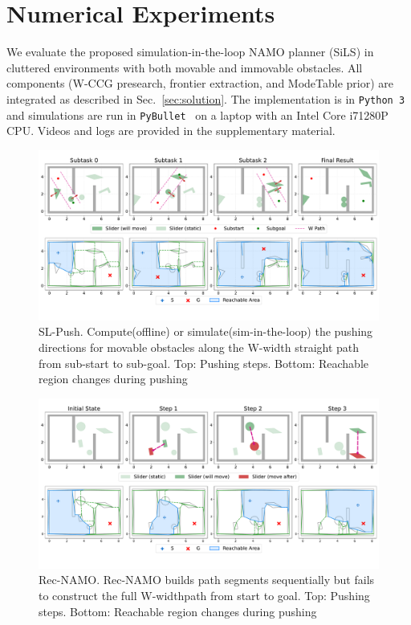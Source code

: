 \section{Numerical Experiments}
\label{sec:experiments}
We evaluate the proposed simulation-in-the-loop NAMO planner (SiLS)
in cluttered environments with both movable and immovable obstacles.
All components (W-CCG presearch, frontier extraction, and ModeTable prior)
are integrated as described in Sec.~\ref{sec:solution}.
The implementation is in \texttt{Python~3} and simulations are run in
\texttt{PyBullet}~\cite{coumans2019} on a laptop with an Intel
Core i7\textendash1280P CPU. Videos and logs are provided in the
supplementary material.
\begin{figure}
  \centering
  \includegraphics[width=\columnwidth]{figures/SL_Push.pdf}
  \vspace{-10mm}
\caption{SL-Push. Compute(offline) or simulate(sim-in-the-loop) the pushing directions for movable obstacles along the W-width straight path from sub-start to sub-goal. Top: Pushing steps. Bottom: Reachable region changes during pushing}
\end{figure}

\begin{figure}
  \centering
  \vspace{-3mm}
  \includegraphics[width=\columnwidth]{figures/Rec_NAMO.pdf}
  \vspace{-10mm}
\caption{Rec-NAMO. Rec-NAMO builds path segments sequentially but fails to construct the full W-widthpath from start to goal. Top: Pushing steps. Bottom: Reachable region changes during pushing}
\end{figure}



